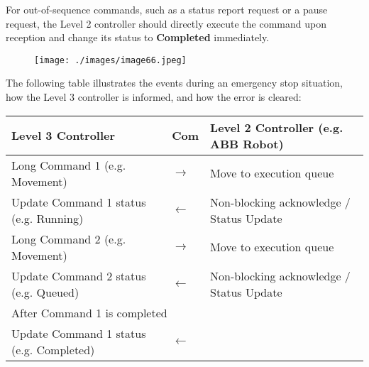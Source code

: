 For out-of-sequence commands, such as a status report request or a pause request, the Level 2 controller should directly execute the command upon reception and change its status to \textbf{Completed }immediately.

\begin{figure}[H]
\texttt{[image: ./images/image66.jpeg]}
\end{figure}


The following table illustrates the events during an emergency stop situation, how the Level 3 controller is informed, and how the error is cleared:

\begin{table}[H]
\begin{adjustbox}{max width=\textwidth}
\begin{tabular}{p{7.04cm}p{1.67cm}p{7.17cm}}
\hline
\multicolumn{1}{|p{7.04cm}}{{\footnotesize \textbf{Level 3 Controller}}} & 
\multicolumn{1}{|p{1.67cm}}{{\footnotesize \textbf{Com}}} & 
\multicolumn{1}{|p{7.17cm}|}{{\footnotesize \textbf{Level 2 Controller (e.g. ABB Robot)}}} \\ 
\hline
\multicolumn{1}{|p{7.04cm}}{{\footnotesize Long Command 1 (e.g. Movement)}} & 
\multicolumn{1}{|p{1.67cm}}{\centering
{\footnotesize $\rightarrow$}} & 
\multicolumn{1}{|p{7.17cm}|}{{\footnotesize Move to execution queue}} \\ 
\hline
\multicolumn{1}{|p{7.04cm}}{{\footnotesize Update Command 1 status (e.g. Running)}} & 
\multicolumn{1}{|p{1.67cm}}{\centering
{\footnotesize $\leftarrow$}} & 
\multicolumn{1}{|p{7.17cm}|}{{\footnotesize Non-blocking acknowledge / Status Update}} \\ 
\hline
\multicolumn{1}{|p{7.04cm}}{{\footnotesize Long Command 2 (e.g. Movement)}} & 
\multicolumn{1}{|p{1.67cm}}{\centering
{\footnotesize $\rightarrow$}} & 
\multicolumn{1}{|p{7.17cm}|}{{\footnotesize Move to execution queue}} \\ 
\hline
\multicolumn{1}{|p{7.04cm}}{{\footnotesize Update Command 2 status (e.g. Queued)}} & 
\multicolumn{1}{|p{1.67cm}}{\centering
{\footnotesize $\leftarrow$}} & 
\multicolumn{1}{|p{7.17cm}|}{{\footnotesize Non-blocking acknowledge / Status Update}} \\ 
\hline
\multicolumn{3}{|p{15.87cm}|}{{\footnotesize After Command 1 is completed}} \\ 
\hline
\multicolumn{1}{|p{7.04cm}}{{\footnotesize Update Command 1 status (e.g. Completed)}} & 
\multicolumn{1}{|p{1.67cm}}{\centering
{\footnotesize $\leftarrow$}} & 

\end{tabular}
\end{adjustbox}
\end{table}

